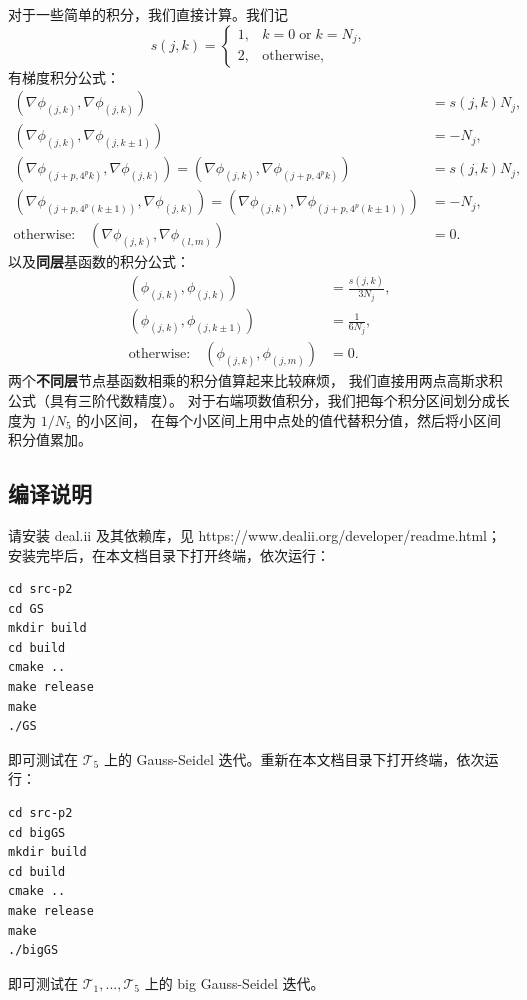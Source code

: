 \documentclass[lang=cn,11pt,a4paper]{elegantpaper}
\begin{document}
对于一些简单的积分，我们直接计算。我们记
\begin{equation}
    s(j,k)=\left\{
        \begin{array}{ll}
            1, & k=0 \; \text{or} \; k=N_j,\\
            2, & \text{otherwise},
        \end{array}
    \right.
\end{equation}
有梯度积分公式：
\begin{align}
    (\nabla \phi_{(j,k)}, \nabla \phi_{(j,k)}) &= s(j,k)N_j, \\
    (\nabla \phi_{(j,k)}, \nabla \phi_{(j,k\pm 1)}) &= -N_j, \\
    (\nabla \phi_{(j+p,4^pk)}, \nabla \phi_{(j,k)}) = (\nabla \phi_{(j,k)}, \nabla \phi_{(j+p,4^pk)}) &= s(j,k)N_j, \\
    (\nabla \phi_{(j+p,4^p(k\pm 1))}, \nabla \phi_{(j,k)}) = (\nabla \phi_{(j,k)}, \nabla \phi_{(j+p,4^p(k\pm 1))}) &= -N_j, \\
    \text{otherwise:} \quad (\nabla \phi_{(j,k)}, \nabla \phi_{(l,m)}) &= 0.
\end{align}
以及\textbf{同层}基函数的积分公式：
\begin{align}
    (\phi_{(j,k)}, \phi_{(j,k)}) &= \frac{s(j,k)}{3N_j}, \\
    (\phi_{(j,k)}, \phi_{(j,k\pm 1)}) &= \frac{1}{6N_j}, \\
    \text{otherwise:} \quad (\phi_{(j,k)}, \phi_{(j,m)}) &= 0.
\end{align}
两个\textbf{不同层}节点基函数相乘的积分值算起来比较麻烦，
我们直接用两点高斯求积公式（具有三阶代数精度）。
对于右端项数值积分，我们把每个积分区间划分成长度为 $1/N_5$ 的小区间，
在每个小区间上用中点处的值代替积分值，然后将小区间积分值累加。


\subsection{编译说明}

请安装 deal.ii 及其依赖库，见 https://www.dealii.org/developer/readme.html；安装完毕后，在本文档目录下打开终端，依次运行：
\begin{lstlisting}
cd src-p2
cd GS
mkdir build
cd build
cmake ..
make release
make
./GS
\end{lstlisting}
即可测试在 $\mathcal{T}_5$ 上的 Gauss-Seidel 迭代。重新在本文档目录下打开终端，依次运行：
\begin{lstlisting}
cd src-p2
cd bigGS
mkdir build
cd build
cmake ..
make release
make
./bigGS
\end{lstlisting}
即可测试在 $\mathcal{T}_1,...,\mathcal{T}_5$ 上的 big Gauss-Seidel 迭代。
\end{document}
